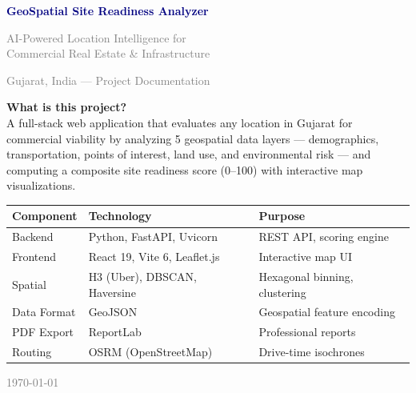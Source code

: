 \documentclass[12pt, a4paper]{article}
\begin{document}
\begin{titlepage}
    \centering
    \vspace*{3cm}

    {\Huge\bfseries\textcolor{navy}{GeoSpatial Site Readiness Analyzer}}

    \vspace{0.8cm}
    {\Large\textcolor{gray}{AI-Powered Location Intelligence for\\Commercial Real Estate \& Infrastructure}}

    \vspace{1.5cm}
    {\large\textcolor{gray}{Gujarat, India — Project Documentation}}

    \vspace{2cm}

    \begin{notebox}
        \textbf{What is this project?}\\[4pt]
        A full-stack web application that evaluates any location in Gujarat for commercial
        viability by analyzing 5 geospatial data layers — demographics, transportation,
        points of interest, land use, and environmental risk — and computing a composite
        site readiness score (0--100) with interactive map visualizations.
    \end{notebox}

    \vspace{1.5cm}

    \begin{tabular}{@{} l l l @{}}
        \toprule
        \textbf{Component} & \textbf{Technology} & \textbf{Purpose} \\
        \midrule
        Backend        & Python, FastAPI, Uvicorn      & REST API, scoring engine \\
        Frontend       & React 19, Vite 6, Leaflet.js  & Interactive map UI \\
        Spatial        & H3 (Uber), DBSCAN, Haversine  & Hexagonal binning, clustering \\
        Data Format    & GeoJSON                       & Geospatial feature encoding \\
        PDF Export     & ReportLab                     & Professional reports \\
        Routing        & OSRM (OpenStreetMap)          & Drive-time isochrones \\
        \bottomrule
    \end{tabular}

    \vfill
    {\small\textcolor{gray}{\today}}
\end{titlepage}
\end{document}
